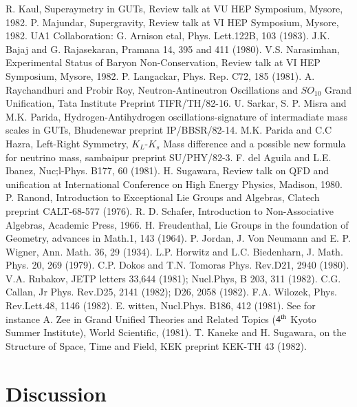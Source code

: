 \begin{thebibliography}{99}
\bibitem{} R. Kaul, Superaymetry in GUTs, Review talk at VU HEP Symposium, Mysore, 1982.
\bibitem{} P. Majundar, Supergravity, Review talk at VI HEP Symposium, Mysore, 1982.
\bibitem{} UA1 Collaboration: G. Arnison etal, Phys. Lett.122B, 103 (1983).
\bibitem{} J.K. Bajaj and G. Rajasekaran, Pramana 14, 395 and 411 (1980).
\bibitem{} V.S. Narasimhan, Experimental Status of Baryon Non-Conservation, Review talk at VI HEP Symposium, Mysore, 1982.
\bibitem{} P. Langackar, Phys. Rep. C72, 185 (1981).
\bibitem{} A. Raychandhuri and Probir Roy, Neutron-Antineutron Oscillations and $SO_{10}$  Grand Unification, Tata Institute Preprint TIFR/TH/82-16.
\bibitem{} U. Sarkar, S. P. Misra and M.K. Parida, Hydrogen-Antihydrogen oscillations-signature of intermadiate mass scales in GUTs, Bhudenewar preprint IP/BBSR/82-14.
\bibitem{} M.K. Parida and C.C Hazra, Left-Right Symmetry, $K_{L}$-$K_{s}$ Mass difference and a possible new formula for neutrino mass, sambaipur preprint SU/PHY/82-3.
\bibitem{} F. del Aguila and L.E. Ibanez, Nuc;l-Phys. B177, 60 (1981).
\bibitem{} H. Sugawara, Review talk on QFD and unification at International Conference on High Energy Physics, Madison, 1980.
\bibitem{} P. Ranond, Introduction to Exceptional Lie Groups and Algebras, Clatech preprint CALT-68-577 (1976).
\bibitem{} R. D. Schafer, Introduction to Non-Associative Algebras, Academic Press, 1966.
\bibitem{} H. Freudenthal, Lie Groups in the foundation of Geometry, advances in Math.1, 143 (1964).
\bibitem{} P. Jordan, J. Von Neumann and E. P. Wigner, Ann. Math. 36, 29 (1934).
\bibitem{} L.P. Horwitz and L.C. Biedenharn, J. Math. Phys. 20, 269 (1979).
\bibitem{} C.P. Dokos and T.N. Tomoras Phys. Rev.D21, 2940 (1980).
\bibitem{} V.A. Rubakov, JETP letters 33,644 (1981); Nucl.Phys, B 203, 311 (1982).
\bibitem{} C.G. Callan, Jr Phys. Rev.D25, 2141 (1982); D26, 2058 (1982).
\bibitem{} F.A. Wilozek, Phys. Rev.Lett.48, 1146 (1982).
\bibitem{} E. witten, Nucl.Phys. B186, 412 (1981).
\bibitem{} See for instance A. Zee in Grand Unified Theories and Related Topics ($4^{\rm th}$ Kyoto Summer Institute), World Scientific, (1981).
\bibitem{} T. Kaneke and H. Sugawara, on the Structure of Space, Time and Field, KEK preprint KEK-TH 43 (1982).
\end{thebibliography}

\section*{Discussion} 

